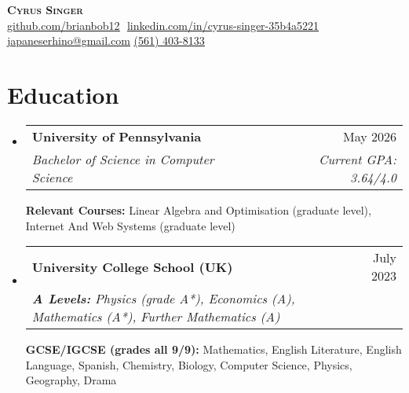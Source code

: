 \documentclass[letterpaper,11pt]{article}
\makeatletter
\newcommand{\resumeSubheading}[4]{
  \vspace{-2pt}\item
    \begin{tabular*}{0.97\textwidth}[t]{l@{\extracolsep{\fill}}r}
      \textbf{#1} & #2 \\
      \textit{\small#3} & \textit{\small #4} \\
    \end{tabular*}\vspace{-7pt}
}
\newcommand{\resumeSubHeadingListStart}{\begin{itemize}[leftmargin=0.15in, label={}]}
\newcommand{\resumeSubHeadingListEnd}{\end{itemize}}
\makeatother
\begin{document}
\hfill

\begin{center}
    \textbf{\Huge \scshape Cyrus Singer} \\ \vspace{8pt}
    \small 
    \href{https://github.com/brianbob12}{\underline{github.com/brianbob12}} $  $
    \href{https://www.linkedin.com/in/cyrus-singer-35b4a5221}{\underline{linkedin.com/in/cyrus-singer-35b4a5221}} $  $
    \href{mailto:japaneserhino@gmail.com}
    {\underline{japaneserhino@gmail.com}}
    \href{tel:561-403-8133}{\underline{(561) 403-8133}}
\end{center}

\section{Education}
  \resumeSubHeadingListStart
  
    \resumeSubheading
      {University of Pennsylvania}{May 2026}
      {Bachelor of Science in Computer Science}{Current GPA: 3.64/4.0}
      
      \vspace{5pt}

      \textbf{Relevant Courses:} \small{Linear Algebra and Optimisation (graduate level), Internet And Web Systems (graduate level)}\\

    \resumeSubheading
      {University College School \footnotesize{(UK)}}{July 2023} 
      {\textbf{A Levels:} \footnotesize{Physics (grade A*), Economics (A), Mathematics (A*), Further Mathematics (A)}}{}
      \newline
      \newline
      {\textbf{GCSE/IGCSE (grades all 9/9):} \footnotesize{Mathematics, English Literature, English Language, Spanish, Chemistry, Biology, Computer Science, Physics, Geography, Drama }}{}



  \resumeSubHeadingListEnd

\end{document}
